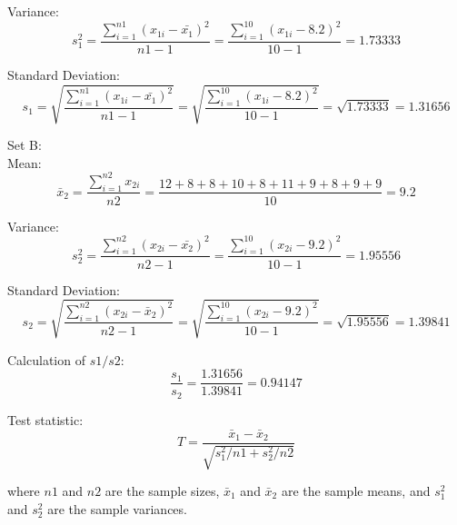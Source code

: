 \documentclass[a4paper,10pt,openright]{report}
\begin{document}
\begin{enumerate}
\hspace*{10mm} Variance:
\begin{equation*}
s_{1}^{2} = \frac{\sum\limits_{i=1}^{n1} (x_{1i} - \bar {x_{1}})^{2}}{n1 - 1}
		= \frac{\sum\limits_{i=1}^{10} (x_{1i} - 8.2)^{2}}{10 -1} = 1.73333
\end{equation*}

\hspace*{10mm} Standard Deviation:
\begin{equation*}
s_{1} = \sqrt{\frac{\sum\limits_{i=1}^{n1} (x_{1i} - \bar {x_{1}})^{2}}{n1 - 1}}
		= \sqrt{\frac{\sum\limits_{i=1}^{10} (x_{1i} - 8.2)^{2}}{10 -1}}
		= \sqrt{1.73333} = 1.31656
\end{equation*}

Set B: \\
\hspace*{10mm} Mean:
\begin{equation*}
\bar x_{2} = \frac{\sum\limits_{i=1}^{n2} x_{2i}}{n2}
	    	= \frac{12 + 8 + 8 + 10 + 8 + 11 + 9 + 8 + 9 + 9}{10}
	    	= 9.2
\end{equation*}

\hspace*{10mm} Variance:
\begin{equation*}
s_{2}^{2} = \frac{\sum\limits_{i=1}^{n2} (x_{2i} - \bar {x_{2}})^{2}}{n2 - 1}
= \frac{\sum\limits_{i=1}^{10} (x_{2i} - 9.2)^{2}}{10 -1} = 1.95556
\end{equation*}

\hspace*{10mm} Standard Deviation:
\begin{equation*}
		s_{2} = \sqrt{\frac{\sum\limits_{i=1}^{n2} (x_{2i} - \bar x_{2})^{2}}{n2 - 1}}
		= \sqrt{\frac{\sum\limits_{i=1}^{10} (x_{2i} - 9.2)^{2}}{10 -1}}
		= \sqrt{1.95556} = 1.39841
\end{equation*}

Calculation of $s1/s2$:
\begin{equation*}
\frac{s_{1}}{s_{2}} = \frac{1.31656}{1.39841} = 0.94147
\end{equation*}

Test statistic: 
\begin{equation*}
		T = \frac{\bar x_{1} - \bar x_{2}}{\sqrt{s_{1}^{2}/n1 + s_{2}^{2}/n2}}
\end{equation*}

where $n1$ and $n2$ are the sample sizes, $\bar x_{1}$ and $\bar x_{2}$ are the sample
means, and $s_{1}^{2}$ and $s_{2}^{2}$ are the sample variances. 


\end{enumerate}
\end{document}
